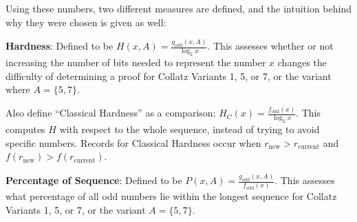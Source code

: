 Using these numbers, two different measures are defined, and the intuition behind why they were chosen is given as well: \par
\textbf{Hardness}: Defined to be $H(x,A) = \frac{g_\text{odd}(x,A)}{\log_2{x}}$. This assesses whether or not increasing the number of bits needed to represent the number $x$ changes the difficulty of determining a proof for Collatz Variants  1, 5, or 7, or the variant where $A=\{5,7\}$.  \par
Also define ``Classical Hardness'' as a comparison: $H_C(x) = \frac{f_\text{odd}(x)}{\log_2{x}}$. This computes $H$ with respect to the whole sequence, instead of trying to avoid specific numbers. Records for Classical Hardness occur when $r_\text{new} > r_\text{current}$ and $f(r_\text{new}) > f(r_\text{current})$. \par
\textbf{Percentage of Sequence}: Defined to be $P(x,A) = \frac{g_\text{odd}(x,A)}{f_\text{odd}(x)}$. This assesses what percentage of all odd numbers lie within the longest sequence for Collatz Variants 1, 5, or 7, or the variant $A=\{5,7\}$.


